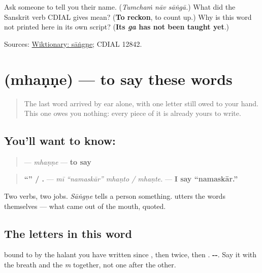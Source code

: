 \begin{tcolorbox}[breakable,colback=teal!4,colframe=teal!35!black,title={Before you move on}]
Ask someone to tell you their name. (\emph{Tumchaṁ nāv sāṅgā.}) What did the Sanskrit verb CDIAL gives mean? (\textbf{To reckon}, to count up.) Why is this word not printed here in its own script? (\textbf{Its \emph{ga} has not been taught yet}.)

Sources: \href{https://en.wiktionary.org/wiki/\%E0\%A4\%B8\%E0\%A4\%BE\%E0\%A4\%82\%E0\%A4\%97\%E0\%A4\%A3\%E0\%A5\%87}{Wiktionary: sāṅgṇe}; CDIAL 12842.
\end{tcolorbox}
\section[\texorpdfstring{\mr{म्हणणे} (mhaṇṇe)}{म्हणणे (mhaṇṇe)}]{ (mhaṇṇe) — to say these words}

\label{lesson:MR-C24-mhanne}



\begin{quote}
The last word arrived by ear alone, with one letter still owed to your hand. This one owes you nothing: every piece of it is already yours to write.
\end{quote}

\subsection*{You'll want to know: }
\begin{quote}
\textbf{} — \emph{mhaṇṇe} — \textbf{to say}
\end{quote}

\begin{quote}
\textbf{ \textquotedblleft{}\textquotedblright{}  / .} — \emph{mī \textquotedblleft{}namaskār\textquotedblright{} mhaṇto / mhaṇte.} — \textbf{I say \textquotedblleft{}namaskār.\textquotedblright{}}
\end{quote}

Two verbs, two jobs. \emph{Sāṅgṇe} tells a person something. \textbf{} utters the words themselves — what came out of the mouth, quoted.

\subsection*{The letters in this word}
\textbf{} bound to \textbf{} by the halant you have written since \textbf{}, then \textbf{} twice, then \textbf{}. \textbf{--}. Say it with the breath and the \emph{m} together, not one after the other.

